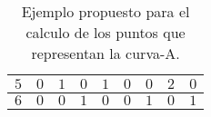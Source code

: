 \begin{table}[htp]
\begin{tabular}{c c c c c c c c c}
        $5$ & \hspace{10pt}$0$      & \hspace{10pt}$1$ & \hspace{10pt}$0$   & \hspace{10pt}$1$    & \hspace{10pt}$0$ & \hspace{10pt}$0$ & \hspace{10pt}$2$  & \hspace{10pt}$0$    \\\hline
        $6$ & \hspace{10pt}$0$      & \hspace{10pt}$0$  & \hspace{10pt}$1$  & \hspace{10pt}$0$    & \hspace{10pt}$0$ & \hspace{10pt}$1$ & \hspace{10pt}$0$ & \hspace{10pt}$1$    \\\hline
    \end{tabular}
    \caption{Ejemplo propuesto para el calculo de los puntos que representan la curva-A.}
    \label{tab:5}
\end{table}

\clearpage